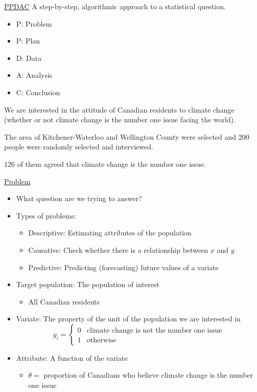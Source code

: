 \underline{PPDAC}
A step-by-step, algorithmic approach to a statistical question.
\begin{itemize}
    \item P\@: Problem
    \item P\@: Plan
    \item D\@: Data
    \item A\@: Analysis
    \item C\@: Conclusion
\end{itemize}
\begin{exbox}
    \begin{example}
        We are interested in the attitude of Canadian residents to climate change
        (whether or not climate change is the number one issue facing the world).
        
        The area of Kitchener-Waterloo and Wellington County were selected
        and $ 200 $ people were randomly selected and interviewed.
        
        $ 126 $ of them agreed that climate change is the number one issue.
    \end{example}
\end{exbox}
\underline{Problem}
\begin{itemize}
    \item What question are we trying to answer?
    \item Types of problems:
          \begin{itemize}
              \item Descriptive: Estimating attributes of the population
              \item Causative: Check whether there is a relationship between $ x $ and $ y $
              \item Predictive: Predicting (forecasting) future values of a variate
          \end{itemize}
    \item Target population: The population of interest
          \begin{itemize}
              \item All Canadian residents
          \end{itemize}
    \item Variate: The property of the unit of the population we are interested in
          \[ y_i=
              \begin{cases}
                  0 & \text{climate change is not the number one issue} \\
                  1 & \text{otherwise}
              \end{cases} \]
    \item Attribute: A function of the variate
          \begin{itemize}
              \item $ \theta= $ proportion of Canadians who believe climate change is the number one issue
          \end{itemize}
\end{itemize}
